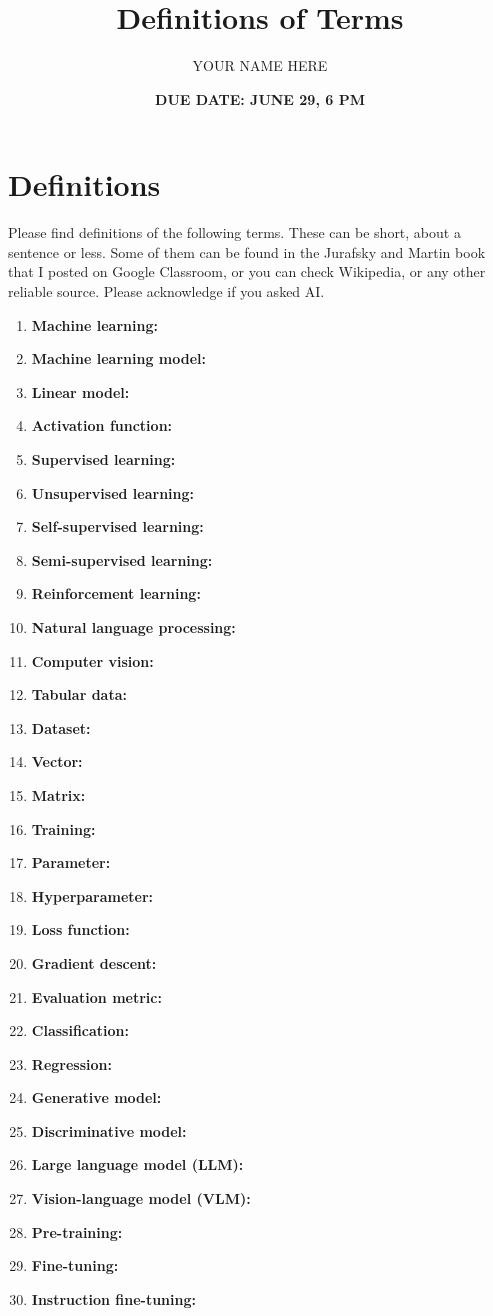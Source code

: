 \documentclass{article}
\title{Definitions of Terms}
\author{YOUR NAME HERE}
\date{\textbf{DUE DATE: JUNE 29, 6 PM}}
\begin{document}
\maketitle

\section{Definitions}

Please find definitions of the following terms. These can be short, about a sentence or less. Some of them can be found in the Jurafsky and Martin book that I posted on Google Classroom, or you can check Wikipedia, or any other reliable source. Please acknowledge if you asked AI.

\begin{enumerate}
    \item \textbf{Machine learning:} 
    \item \textbf{Machine learning model:} 
    \item \textbf{Linear model:} 
    \item \textbf{Activation function:} 
    \item \textbf{Supervised learning:} 
    \item \textbf{Unsupervised learning:} 
    \item \textbf{Self-supervised learning:} 
    \item \textbf{Semi-supervised learning:} 
    \item \textbf{Reinforcement learning:} 
    \item \textbf{Natural language processing:} 
    \item \textbf{Computer vision:} 
    \item \textbf{Tabular data:} 
    \item \textbf{Dataset:} 
    \item \textbf{Vector:} 
    \item \textbf{Matrix:} 
    \item \textbf{Training:} 
    \item \textbf{Parameter:} 
    \item \textbf{Hyperparameter:} 
    \item \textbf{Loss function:} 
    \item \textbf{Gradient descent:} 
    \item \textbf{Evaluation metric:} 
    \item \textbf{Classification:} 
    \item \textbf{Regression:} 
    \item \textbf{Generative model:} 
    \item \textbf{Discriminative model:} 
    \item \textbf{Large language model (LLM):} 
    \item \textbf{Vision-language model (VLM):} 
    \item \textbf{Pre-training:} 
    \item \textbf{Fine-tuning:} 
    \item \textbf{Instruction fine-tuning:} 
\end{enumerate}
\end{document}
